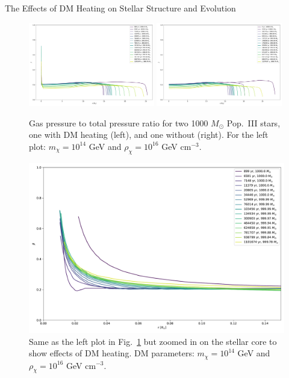 \documentclass[a4paper,11pt]{article}
\begin{document}
\begin{section}{The Effects of DM Heating on Stellar Structure and Evolution}
\begin{figure}
    \end{figure}
    \begin{figure}
        \centering
        \includegraphics[width=0.49\textwidth]{beta_profile_DM.pdf}
        \includegraphics[width=0.49\textwidth]{beta_profile_noDM.pdf}
        \caption{Gas pressure to total pressure ratio for two 1000 $M_\odot$ Pop.~III stars, one with DM heating (left), and one without (right). For the left plot: $m_\chi = 10^{14}$ GeV and $\rho_\chi = 10^{16}$ GeV cm$^{-3}$.}
        \label{beta}
    \end{figure}
    \begin{figure}
        \centering
        \includegraphics[trim={0 0.25cm 0 0.25cm},clip,width=1\textwidth]{beta_core_DM.pdf}
        \caption{Same as the left plot in Fig.~\ref{beta} but zoomed in on the stellar core to show effects of DM heating. DM parameters: $m_\chi = 10^{14}$ GeV and $\rho_\chi = 10^{16}$ GeV cm$^{-3}$.}

\end{figure}
\end{section}
\end{document}
